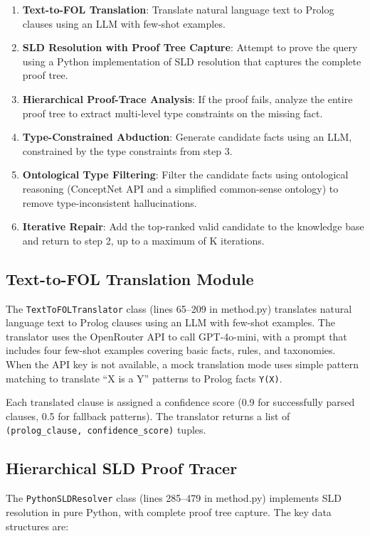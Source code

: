 \documentclass[11pt,letterpaper]{article}
\begin{document}
\begin{enumerate}
  \item \textbf{Text-to-FOL Translation}: Translate natural language text to Prolog clauses using an LLM with few-shot examples.
  \item \textbf{SLD Resolution with Proof Tree Capture}: Attempt to prove the query using a Python implementation of SLD resolution that captures the complete proof tree.
  \item \textbf{Hierarchical Proof-Trace Analysis}: If the proof fails, analyze the entire proof tree to extract multi-level type constraints on the missing fact.
  \item \textbf{Type-Constrained Abduction}: Generate candidate facts using an LLM, constrained by the type constraints from step 3.
  \item \textbf{Ontological Type Filtering}: Filter the candidate facts using ontological reasoning (ConceptNet API and a simplified common-sense ontology) to remove type-inconsistent hallucinations.
  \item \textbf{Iterative Repair}: Add the top-ranked valid candidate to the knowledge base and return to step 2, up to a maximum of K iterations.
\end{enumerate}

\subsection{Text-to-FOL Translation Module}

The \texttt{TextToFOLTranslator} class (lines 65--209 in method.py) translates natural language text to Prolog clauses using an LLM with few-shot examples. The translator uses the OpenRouter API to call GPT-4o-mini, with a prompt that includes four few-shot examples covering basic facts, rules, and taxonomies. When the API key is not available, a mock translation mode uses simple pattern matching to translate ``X is a Y'' patterns to Prolog facts \texttt{Y(X)}.

Each translated clause is assigned a confidence score (0.9 for successfully parsed clauses, 0.5 for fallback patterns). The translator returns a list of \texttt{(prolog\_clause, confidence\_score)} tuples.

\subsection{Hierarchical SLD Proof Tracer}

The \texttt{PythonSLDResolver} class (lines 285--479 in method.py) implements SLD resolution in pure Python, with complete proof tree capture. The key data structures are:
\end{document}
